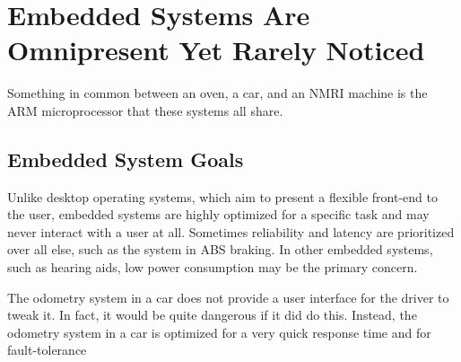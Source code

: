 \chapter{Embedded Systems Are Omnipresent Yet Rarely Noticed}

Something in common between an oven, a car, and an NMRI machine is the ARM microprocessor that
these systems all share.

\section{Embedded System Goals}
Unlike desktop operating systems, which aim to present a flexible front-end to the user, embedded systems are highly
optimized for a specific task and may never interact with a user at all. Sometimes reliability and latency are prioritized over
all else, such as the system in ABS braking. In other embedded systems, such as hearing aids, low power consumption
may be the primary concern.




The odometry system in a car does not provide
a user interface for the driver to tweak it. In fact, it would be quite dangerous if it did do this. Instead, the odometry
system in a car is optimized for a very quick response time and for fault-tolerance
